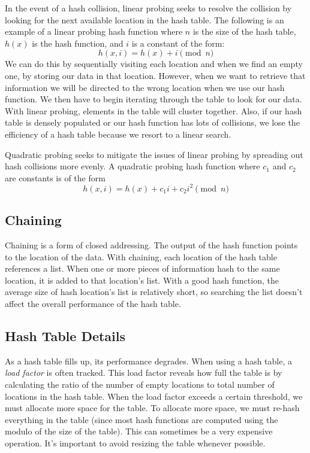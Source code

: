 In the event of a hash collision, linear probing seeks to resolve the collision by looking for the next available location in the hash table.
The following is an example of a linear probing hash function where $n$ is the size of the hash table, $h(x)$ is the hash function, and $i$ is a constant of the form:
\begin{equation*}
h(x, i) = h(x) + i \pmod{n}
\end{equation*}
We can do this by sequentially visiting each location and when we find an empty one, by storing our data in that location.
However, when we want to retrieve that information we will be directed to the wrong location when we use our hash function.
We then have to begin iterating through the table to look for our data.
With linear probing, elements in the table will cluster together.
Also, if our hash table is densely populated or our hash function has lots of collisions,
 we lose the efficiency of a hash table because we resort to a linear search.

Quadratic probing seeks to mitigate the issues of linear probing by spreading out hash collisions more evenly.
A quadratic probing hash function where $c_1$ and $c_2$ are constants is of the form
\begin{equation*}
h(x, i) = h(x) + c_1i + c_2i^2 \pmod{n}
\end{equation*}

\subsection*{Chaining}
Chaining is a form of closed addressing.  The output of the hash function points to the location of the data.
With chaining, each location of the hash table references a list.
When one or more pieces of information hash to the same location, it is added to that location's list.
With a good hash function, the average size of hash location's list is relatively short,
so searching the list doesn't affect the overall performance of the hash table.

\subsection*{Hash Table Details}
As a hash table fills up, its performance degrades.
When using a hash table, a \emph{load factor} is often tracked.
This load factor reveals how full the table is by calculating the ratio of the number of empty locations to total number of locations in the hash table.
When the load factor exceeds a certain threshold, we must allocate more space for the table.
To allocate more space, we must re-hash everything in the table (since most hash functions are computed using the modulo \li{(\%)} of the size of the table).
This can sometimes be a very expensive operation.
It's important to avoid resizing the table whenever possible.

